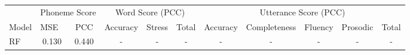 \documentclass{article}
\begin{document}
\begin{table*}[]
\small
\centering
\setlength\tabcolsep{4.3pt}
\begin{tabular}{lcccccccccc}
\hline
\multicolumn{1}{c}{}                        & \multicolumn{2}{c}{Phoneme  Score}                                                                                                                             & \multicolumn{3}{c}{Word Score (PCC)}                                                                                                                                                                                                          & \multicolumn{5}{c}{Utterance Score (PCC)}                                                                                                                                                                                                                                                                                                                                                                     \\ \cline{2-11} 
\multicolumn{1}{c}{\multirow{-2}{*}{Model}} & \multicolumn{1}{l}{MSE }                                                       & \multicolumn{1}{c|}{PCC }                                                     & Accuracy                                                                       & Stress                                                                      & \multicolumn{1}{c|}{Total }                                                    & Accuracy                                                                       & Completeness                                                                   & Fluency                                                                        & Prosodic                                                                       & Total                                                                          \\ \hline
RF~\cite{zhang2021speechocean762}                               & 0.130                                                                         & 0.440                                                                        & -                                                                             & -                                                                             & -                                                                             & -                                                                             & -                                                                             & -                                                                             & -                                                                             & -                                                                             \\

\end{tabular}
\end{table*}
\end{document}
